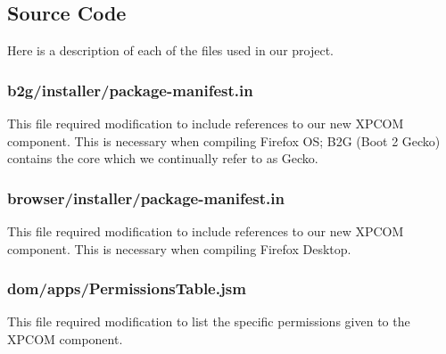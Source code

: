 \documentclass[12pt]{article}
\begin{document}
\subsection{Source Code}
Here is a description of each of the files used in our project.

\subsubsection{b2g/installer/package-manifest.in}
This file required modification to include references to our new XPCOM component. This is necessary when compiling Firefox OS; B2G (Boot 2 Gecko) contains the core which we continually refer to as Gecko.

\subsubsection{browser/installer/package-manifest.in}
This file required modification to include references to our new XPCOM component. This is necessary when compiling Firefox Desktop.

\subsubsection{dom/apps/PermissionsTable.jsm}
This file required modification to list the specific permissions given to the XPCOM component.
\end{document}

